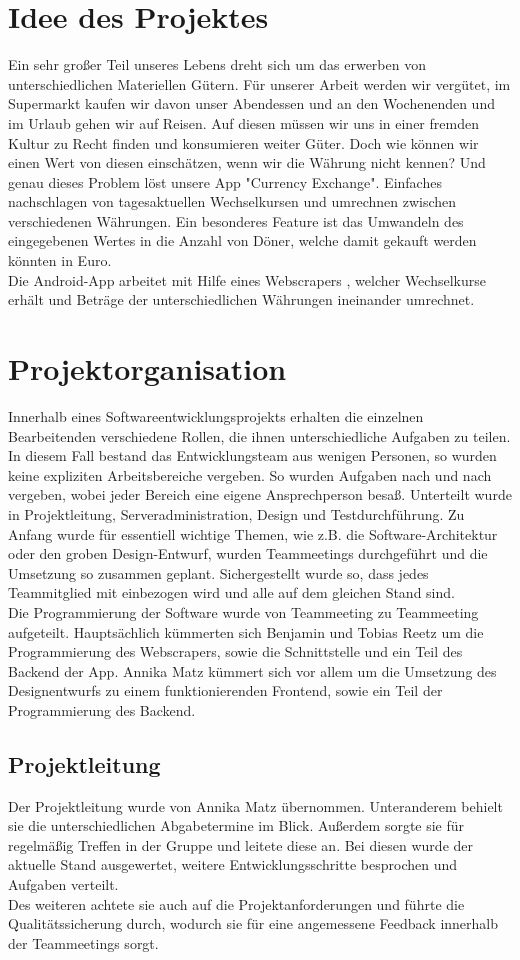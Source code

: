 \documentclass[conference]{IEEEtran}
\begin{document}
\section{Idee des Projektes}
Ein sehr großer Teil unseres Lebens dreht sich um das erwerben von unterschiedlichen Materiellen Gütern. Für unserer Arbeit werden wir vergütet, im Supermarkt kaufen wir davon unser Abendessen und an den Wochenenden und im Urlaub gehen wir auf Reisen. Auf diesen müssen wir uns in einer fremden Kultur zu Recht finden und konsumieren weiter Güter. Doch wie können wir einen Wert von diesen einschätzen, wenn wir die Währung nicht kennen? Und genau dieses Problem löst unsere App "Currency Exchange". Einfaches nachschlagen von tagesaktuellen Wechselkursen und umrechnen zwischen verschiedenen Währungen. Ein besonderes Feature ist das Umwandeln des eingegebenen Wertes in die Anzahl von Döner, welche damit gekauft werden könnten in Euro. \\
Die  Android-App arbeitet mit Hilfe eines Webscrapers , welcher Wechselkurse erhält und Beträge der unterschiedlichen Währungen ineinander umrechnet.

\section{Projektorganisation}
Innerhalb eines Softwareentwicklungsprojekts erhalten die einzelnen Bearbeitenden verschiedene Rollen, die ihnen unterschiedliche Aufgaben zu teilen. In diesem Fall bestand das Entwicklungsteam aus wenigen Personen, so wurden keine expliziten Arbeitsbereiche vergeben.  So wurden Aufgaben nach und nach vergeben, wobei jeder Bereich eine eigene Ansprechperson besaß. Unterteilt wurde in Projektleitung, Serveradministration, Design und Testdurchführung. Zu Anfang wurde für essentiell wichtige Themen, wie z.B. die Software-Architektur oder den groben Design-Entwurf, wurden Teammeetings durchgeführt und die Umsetzung so zusammen geplant. Sichergestellt wurde so, dass jedes Teammitglied mit einbezogen wird und alle auf dem gleichen Stand sind. \\
Die Programmierung der Software wurde von Teammeeting zu Teammeeting aufgeteilt. Hauptsächlich kümmerten sich Benjamin und Tobias Reetz um die Programmierung des Webscrapers, sowie die Schnittstelle und ein Teil des Backend der App. Annika Matz kümmert sich vor allem um die Umsetzung des Designentwurfs zu einem funktionierenden Frontend, sowie ein Teil der Programmierung des Backend.

\subsection{Projektleitung}
Der Projektleitung wurde von Annika Matz übernommen. Unteranderem behielt sie die unterschiedlichen Abgabetermine im Blick. Außerdem sorgte sie für regelmäßig Treffen in der Gruppe und leitete diese an. Bei diesen wurde der aktuelle Stand ausgewertet, weitere Entwicklungsschritte besprochen und Aufgaben verteilt. \\
Des weiteren achtete sie auch auf die Projektanforderungen und führte die Qualitätssicherung durch, wodurch sie für eine angemessene Feedback innerhalb der Teammeetings sorgt.
\end{document}
